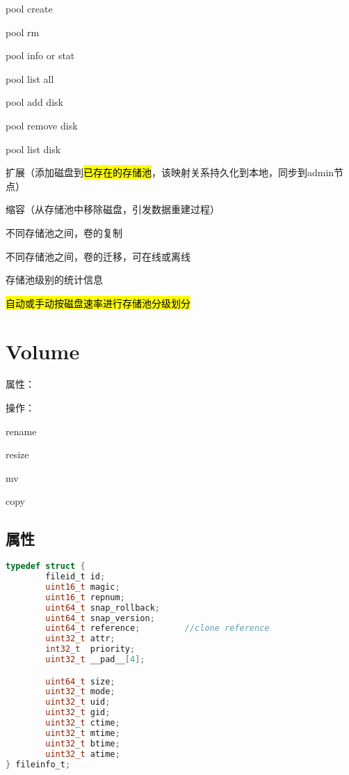 \begin{enumbox}
\item pool create
\item pool rm
\item pool info or stat
\item pool list all
\item pool add disk
\item pool remove disk
\item pool list disk
\item 扩展（添加磁盘到\hl{已存在的存储池}，该映射关系持久化到本地，同步到admin节点）
\item 缩容（从存储池中移除磁盘，引发数据重建过程）
\item 不同存储池之间，卷的复制
\item 不同存储池之间，卷的迁移，可在线或离线
\item 存储池级别的统计信息
\item \hl{自动或手动按磁盘速率进行存储池分级划分}
\end{enumbox}

\section{Volume}

属性：

操作：
\begin{compactenum}
\item rename
\item resize 
\item mv
\item copy   %
\end{compactenum}

\subsection{属性}

\begin{lstlisting}[language=c,frame=single]
typedef struct {
        fileid_t id;
        uint16_t magic;
        uint16_t repnum;
        uint64_t snap_rollback;
        uint64_t snap_version;
        uint64_t reference;         //clone reference
        uint32_t attr;
        int32_t  priority;
        uint32_t __pad__[4];

        uint64_t size;
        uint32_t mode;
        uint32_t uid;
        uint32_t gid;
        uint32_t ctime;
        uint32_t mtime;
        uint32_t btime;
        uint32_t atime;
} fileinfo_t;
\end{lstlisting}

